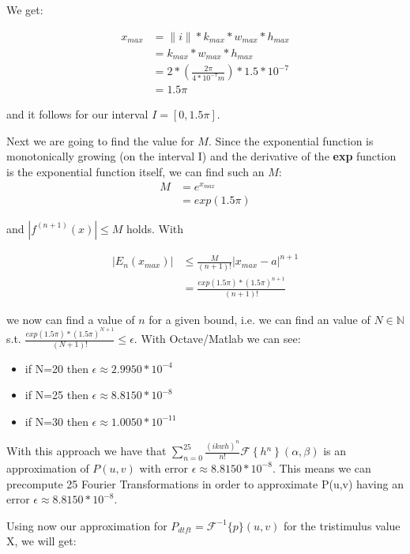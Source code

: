 We get:  

\begin{align}
x_{max}
 &= \|i\|*k_{max}*w_{max}*h_{max} \nonumber \\
 &= k_{max}*w_{max}*h_{max} \nonumber \\
 &=2*(\frac{2\pi}{4*10^{-7}m})*1.5*10^{-7} \nonumber \\
 &=1.5\pi
\end{align}

and it follows for our interval $I=[0,1.5\pi]$. 

Next we are going to find the value for $M$. Since the exponential function is monotonically growing (on the interval I) and the derivative of the \textbf{exp} function is the exponential function itself, we can find such an $M$: 
\begin{align*}
 M
 &=e^{x_{max}} \nonumber \\
 &=exp(1.5\pi)
\end{align*}

and $|f^{(n+1)}(x)|\leq M$ holds. With 

\begin{align}
|E_{n}(x_{max})|
 &\leq\frac{M}{(n+1)!}|x_{max}-a|^{n+1} \nonumber \\
 &= \frac{exp(1.5\pi)*(1.5\pi)^{n+1}}{(n+1)!}
\end{align}

we now can find a value of $n$ for a given bound, i.e. we can find an value of $N\mathbb{\in N}$ s.t. $\frac{exp(1.5\pi)*(1.5\pi)^{N+1}}{(N+1)!}\leq\epsilon$.
With Octave/Matlab we can see: 

\begin{itemize}
\item if N=20 then $\epsilon\approx2.9950*10^{-4}$
\item if N=25 then $\epsilon\approx8.8150*10^{-8}$
\item if N=30 then $\epsilon\approx1.0050*10^{-11}$
\end{itemize}

With this approach we have that $\sum_{n=0}^{25}\frac{(ikwh)^{n}}{n!}\mathcal{F}\left\{ h{}^{n}\right\} (\alpha,\beta)$ is
an approximation of $P(u,v)$ with error $\epsilon\approx8.8150*10^{-8}$. This means we can precompute 25 Fourier Transformations in order to approximate P(u,v) having an error $\epsilon\approx8.8150*10^{-8}$. 

Using now our approximation for $P_{dtft} = \mathcal{F}^{-1}\{p\}(u,v)$ for the tristimulus value X, we will get:

